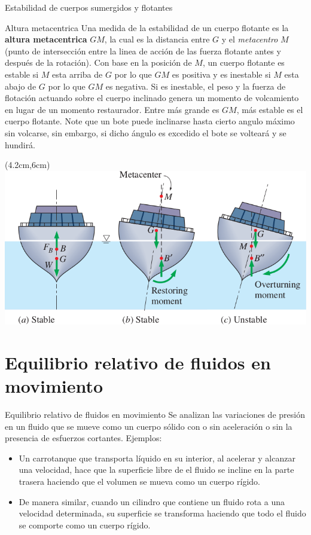 \documentclass [xcolor=svgnames, t] {beamer}
\begin{document}
\begin{frame}{Estabilidad de cuerpos sumergidos y flotantes}
\small
\vspace{-0.5cm}
\begin{block}{Altura metacentrica}
Una medida de la estabilidad de un cuerpo flotante es la \textbf{altura metacentrica} $GM$, la cual es la distancia entre $G$ y el \emph{metacentro} $M$ (punto de intersecci\'on entre la linea de acci\'on de las fuerza flotante antes y despu\'es de la rotaci\'on). Con base en la posici\'on de $M$, un cuerpo flotante es estable si $M$ esta arriba de $G$ por lo que $GM$ es positiva y es inestable si $M$ esta abajo de $G$ por lo que $GM$ es negativa. Si es inestable, el peso y la fuerza de flotaci\'on actuando sobre el cuerpo inclinado genera un momento de volcamiento en lugar de un momento restaurador. Entre m\'as grande es $GM$, m\'as estable es el cuerpo flotante. Note que un bote puede inclinarse hasta cierto angulo m\'aximo sin volcarse, sin embargo, si dicho \'angulo es excedido el bote se voltear\'a y se hundir\'a.  
\begin{textblock*}{5cm}(4.2cm,6cm) %
\includegraphics[width=\textwidth]{rota3}
\end{textblock*}
\end{block}
\end{frame}



\section{Equilibrio relativo de fluidos en movimiento}
\begin{frame}{Equilibrio relativo de fluidos en movimiento}
Se analizan las variaciones de presi\'on en un fluido que se mueve como un cuerpo s\'olido con o sin aceleraci\'on o sin la presencia de esfuerzos cortantes. Ejemplos:
\begin{itemize}
\item Un carrotanque que transporta l\'iquido en su interior, al acelerar y alcanzar una velocidad, hace que la superficie libre de el fluido se incline en la parte trasera haciendo que el volumen se mueva como un cuerpo r\'igido. 
\item De manera similar, cuando un cilindro que contiene un fluido rota a una velocidad determinada, su superficie se transforma haciendo que todo el fluido se comporte como un cuerpo r\'igido.
\end{itemize}
\end{frame}
\end{document}
